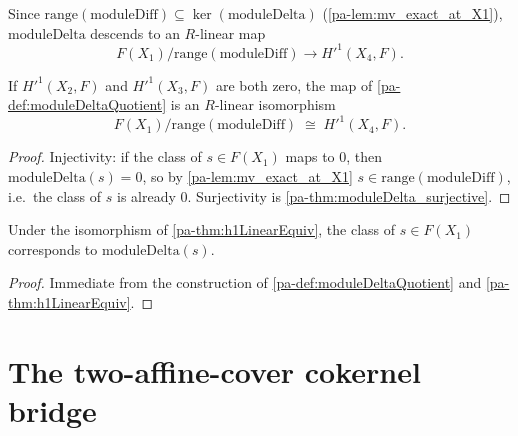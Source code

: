 \begin{definition}
  \label{pa-def:moduleDeltaQuotient}
  \leanok

  Since \(\mathrm{range}(\mathrm{moduleDiff}) \subseteq \ker(\mathrm{moduleDelta})\)
  (\ref{pa-lem:mv_exact_at_X1}), \(\mathrm{moduleDelta}\) descends to an \(R\)-linear map
  \[
    F(X_1)/\mathrm{range}(\mathrm{moduleDiff}) \longrightarrow H'^1(X_4,F).
  \]
\end{definition}

\begin{theorem}
  \label{pa-thm:h1LinearEquiv}
  \leanok

  If \(H'^1(X_2,F)\) and \(H'^1(X_3,F)\) are both zero, the map of
  \ref{pa-def:moduleDeltaQuotient} is an \(R\)-linear isomorphism
  \[
    F(X_1)/\mathrm{range}(\mathrm{moduleDiff}) \;\cong\; H'^1(X_4,F).
  \]
\end{theorem}
\begin{proof}
  \leanok
  Injectivity: if the class of \(s \in F(X_1)\) maps to \(0\), then
  \(\mathrm{moduleDelta}(s) = 0\), so by \ref{pa-lem:mv_exact_at_X1}
  \(s \in \mathrm{range}(\mathrm{moduleDiff})\), i.e.\ the class of \(s\) is already \(0\).
  Surjectivity is \ref{pa-thm:moduleDelta_surjective}.
\end{proof}

\begin{lemma}
  \label{pa-lem:h1LinearEquiv_mk}
  \leanok

  Under the isomorphism of \ref{pa-thm:h1LinearEquiv}, the class of \(s \in F(X_1)\)
  corresponds to \(\mathrm{moduleDelta}(s)\).
\end{lemma}
\begin{proof}
  \leanok
  Immediate from the construction of \ref{pa-def:moduleDeltaQuotient} and
  \ref{pa-thm:h1LinearEquiv}.
\end{proof}

\section{The two-affine-cover cokernel bridge}

